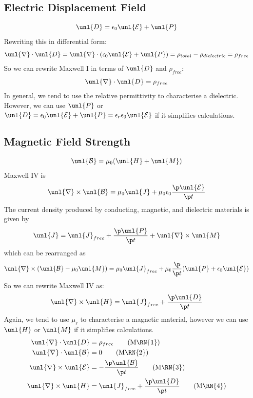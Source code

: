 \documentclass[a4paper, 11pt, normalem]{report}
\renewcommand\E{\mathcal{E}}
\newcommand\uE{\unl{\E}}
\renewcommand\B{\mathcal{B}}
\newcommand\uB{\unl{\B}}
\renewcommand\del{\unl{\nabla}}
\newcommand\eno{\epsilon_0}
\newcommand\J{\unl{J}}
\newcommand\er{\epsilon_r}
\begin{document}
\subsection{Electric Displacement Field}
\begin{equation}
	\unl{D} = \eno\uE + \unl{P}
\end{equation}
Rewriting this in differential form:
\begin{equation}
	\del\cdot\unl{D} = \del\cdot(\eno\uE+\unl{P}) = \rho_{total} - \rho_{dielectric} = \rho_{free}
\end{equation}
So we can rewrite Maxwell \RN{1} in terms of $\unl{D}$ and $\rho_{free}$:
\begin{equation}
	\del\cdot\unl{D} = \rho_{free}
\end{equation}
In general, we tend to use the relative permittivity to characterise a dielectric.
However, we can use $\unl{P}$ or $\unl{D} = \eno\uE + \unl{P} = \er\eno\uE$ if it simplifies calculations.

\subsection{Magnetic Field Strength}
\begin{equation}
	\uB = \mu_0(\unl{H}+\unl{M})
\end{equation}
Maxwell \RN{4} is
\begin{equation}
	\del\times\uB = \mu_0\J + \mu_0\eno\frac{\p \uE}{\p t}
\end{equation}
The current density produced by conducting, magnetic, and dielectric materials is given by
\begin{equation}
	\J = \J_{free} + \frac{\p\unl{P}}{\p t} + \del\times\unl{M}
\end{equation}
which can be rearranged as
\begin{equation}
	\del\times(\uB-\mu_0\unl{M}) = \mu_0\J_{free} + \mu_0\frac{\p}{\p t}(\unl{P} + \eno\uE)
\end{equation}
So we can rewrite Maxwell \RN{4} as:
\begin{equation}
	\del\times\unl{H} = \J_{free} + \frac{\p\unl{D}}{\p t}
\end{equation}
Again, we tend to use $\mu_r$ to characterise a magnetic material, however we can use $\unl{H}$ or $\unl{M}$ if it simplifies calculations.
\begin{align}
	\del\cdot\unl{D} &= \rho_{free} \tag{M\RN{1}} \\
	\del\cdot\uB &= 0 \tag{M\RN{2}} \\
	\del\times\uE &= -\frac{\p\uB}{\p t} \tag{M\RN{3}} \\
	\del\times\unl{H} &= \J_{free} + \frac{\p\unl{D}}{\p t} \tag{M\RN{4}}
\end{align}
\end{document}
